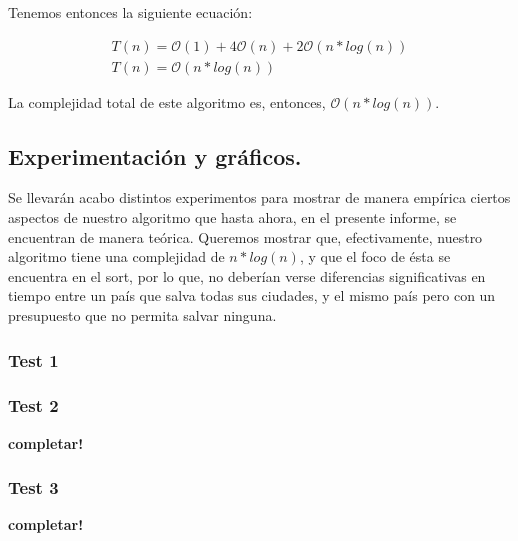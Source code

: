 Tenemos entonces la siguiente ecuación:

\begin{equation*}
\begin{array}{l}
T(n) = \mathcal{O}(1) + 4\mathcal{O}(n) + 2\mathcal{O}(n*log(n))\\
T(n) = \mathcal{O}(n*log(n))
\end{array}
\end{equation*}

La complejidad total de este algoritmo es, entonces, $\mathcal{O}(n*log(n))$.

\vspace*{0.6cm}
\subsection{Experimentación y gráficos.}

\vspace*{0.3cm}

Se llevarán acabo distintos experimentos para mostrar de manera empírica ciertos aspectos de nuestro algoritmo que hasta ahora, en el presente informe, se encuentran de manera teórica. Queremos mostrar que, efectivamente, nuestro algoritmo tiene una complejidad de $n*log(n)$, y que el foco de ésta se encuentra en el sort, por lo que, no deberían verse diferencias significativas en tiempo entre un país que salva todas sus ciudades, y el mismo país pero con un presupuesto que no permita salvar ninguna.

\subsubsection{Test 1}

\vspace*{0.3cm}




\newpage
\subsubsection{Test 2}

\vspace*{0.3cm}

\textbf{completar!}


\newpage
\subsubsection{Test 3}

\vspace*{0.3cm}

\textbf{completar!}
